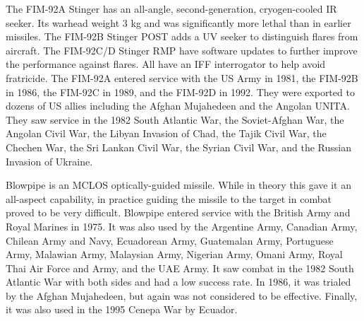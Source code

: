 The FIM-92A Stinger has an all-angle, second-generation, cryogen-cooled IR seeker.
Its warhead weight 3 kg and was significantly more lethal than in earlier missiles.
The FIM-92B Stinger POST adds a UV seeker to distinguish flares from aircraft.
The FIM-92C/D Stinger RMP have software updates to further improve the performance against flares.
All have an IFF interrogator to help avoid fratricide.
The FIM-92A entered service with the US Army in 1981, the FIM-92B in 1986, the FIM-92C in 1989, and the FIM-92D in 1992. They were exported to dozens of US allies including the Afghan Mujahedeen and the Angolan UNITA. They saw service in the 1982 South Atlantic War, the Soviet-Afghan War, the Angolan Civil War, the Libyan Invasion of Chad, the Tajik Civil War, the Chechen War, the Sri Lankan Civil War, the Syrian Civil War, and the Russian Invasion of Ukraine.%


Blowpipe is an MCLOS optically-guided missile.
While in theory this gave it an all-aspect capability, in practice guiding the missile to the target in combat proved to be very difficult.
Blowpipe entered service with the British Army and Royal Marines in 1975.
It was also used by the Argentine Army, Canadian Army, Chilean Army and Navy, Ecuadorean Army, Guatemalan Army, Portuguese Army, Malawian Army, Malaysian Army, Nigerian Army, Omani Army, Royal Thai Air Force and Army, and the UAE Army.
It saw combat in the 1982 South Atlantic War with both sides and had a low success rate.
In 1986, it was trialed by the Afghan Mujahedeen, but again was not considered to be effective.
Finally, it was also used in the 1995 Cenepa War by Ecuador.%

